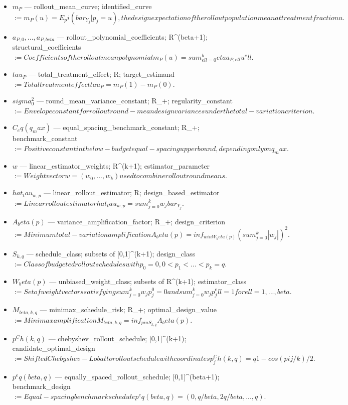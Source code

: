 \documentclass{article}
\begin{document}
\begin{itemize}
  \item $m_P$ --- rollout_mean_curve; identified_curve $:= m_P(u) = E_pi(bar_Y_j | p_j = u), the design expectation of the rollout population mean at treatment fraction u.$
  \item $a_{P,0}, ..., a_{P,beta}$ --- rollout_polynomial_coefficients; R^(beta+1); structural_coefficients $:= Coefficients of the rollout mean polynomial m_P(u) = sum_{ell=0}^beta a_{P,ell} u^ell.$
  \item $tau_P$ --- total_treatment_effect; R; target_estimand $:= Total treatment effect tau_P = m_P(1) - m_P(0).$
  \item $sigma_0^2$ --- round_mean_variance_constant; R_+; regularity_constant $:= Envelope constant for rollout round-mean design variances under the total-variation criterion.$
  \item $C_eq(q_max)$ --- equal_spacing_benchmark_constant; R_+; benchmark_constant $:= Positive constant in the low-budget equal-spacing upper bound, depending only on q_max.$
  \item $w$ --- linear_estimator_weights; R^(k+1); estimator_parameter $:= Weight vector w = (w_0, ..., w_k) used to combine rollout round means.$
  \item $hat_tau_{w,p}$ --- linear_rollout_estimator; R; design_based_estimator $:= Linear rollout estimator hat_tau_{w,p} = sum_{j=0}^k w_j bar_Y_j.$
  \item $A_beta(p)$ --- variance_amplification_factor; R_+; design_criterion $:= Minimum total-variation amplification A_beta(p) = inf_{w in W_beta(p)} (sum_{j=0}^k |w_j|)^2.$
  \item $S_{k,q}$ --- schedule_class; subsets of [0,1]^(k+1); design_class $:= Class of budgeted rollout schedules with p_0 = 0, 0 < p_1 < ... < p_k = q.$
  \item $W_beta(p)$ --- unbiased_weight_class; subsets of R^(k+1); estimator_class $:= Set of weight vectors satisfying sum_{j=0}^k w_j p_j^0 = 0 and sum_{j=0}^k w_j p_j^ell = 1 for ell = 1, ..., beta.$
  \item $M_{beta,k,q}$ --- minimax_schedule_risk; R_+; optimal_design_value $:= Minimax amplification M_{beta,k,q} = inf_{p in S_{k,q}} A_beta(p).$
  \item $p^Ch(k,q)$ --- chebyshev_rollout_schedule; [0,1]^(k+1); candidate_optimal_design $:= Shifted Chebyshev-Lobatto rollout schedule with coordinates p_j^Ch(k,q) = q { 1 - cos(pi j / k) } / 2.$
  \item $p^eq(beta,q)$ --- equally_spaced_rollout_schedule; [0,1]^(beta+1); benchmark_design $:= Equal-spacing benchmark schedule p^eq(beta,q) = (0, q / beta, 2 q / beta, ..., q).$

\end{itemize}
\end{document}
